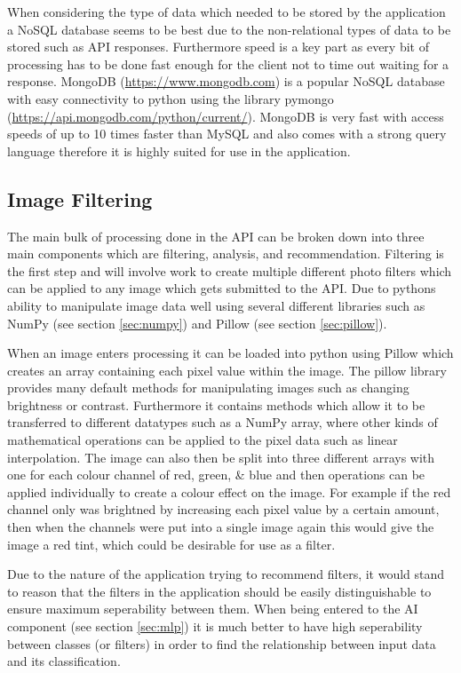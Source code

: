\documentclass[a4paper,12pt]{report}
\begin{document}
      When considering the type of data which needed to be stored by the application a NoSQL database seems to be best due to the non-relational types of data to be stored such as API responses. Furthermore speed is a key part as every bit of processing has to be done fast enough for the client not to time out waiting for a response. MongoDB (\url{https://www.mongodb.com}) is a popular NoSQL database with easy connectivity to python using the library pymongo (\url{https://api.mongodb.com/python/current/}). MongoDB is very fast with access speeds of up to 10 times faster than MySQL \citep{han2011survey} and also comes with a strong query language therefore it is highly suited for use in the application.

    \subsection{Image Filtering}
      The main bulk of processing done in the API can be broken down into three main components which are filtering, analysis, and recommendation. Filtering is the first step and will involve work to create multiple different photo filters which can be applied to any image which gets submitted to the API. Due to pythons ability to manipulate image data well using several different libraries such as NumPy (see section \ref{sec:numpy}) and Pillow (see section \ref{sec:pillow}).

      When an image enters processing it can be loaded into python using Pillow which creates an array containing each pixel value within the image. The pillow library provides many default methods for manipulating images such as changing brightness or contrast. Furthermore it contains methods which allow it to be transferred to different datatypes such as a NumPy array, where other kinds of mathematical operations can be applied to the pixel data such as linear interpolation. The image can also then be split into three different arrays with one for each colour channel of red, green, \& blue and then operations can be applied individually to create a colour effect on the image. For example if the red channel only was brightned by increasing each pixel value by a certain amount, then when the channels were put into a single image again this would give the image a red tint, which could be desirable for use as a filter.

      Due to the nature of the application trying to recommend filters, it would stand to reason that the filters in the application should be easily distinguishable to ensure maximum seperability between them. When being entered to the AI component (see section \ref{sec:mlp}) it is much better to have high seperability between classes (or filters) in order to find the relationship between input data and its classification.
\end{document}
